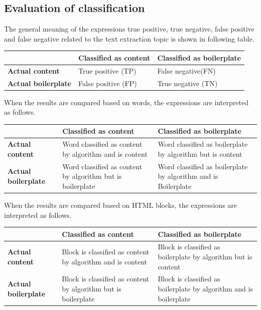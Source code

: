 \subsection{Evaluation of classification}
\label{subsec:Evaluation of classification}


The general meaning of the expressions true positive, true negative, false positive and false negative related to the text extraction topic is shown in following table.

\begin{table}[h]
\begin{tabular}{|p{4cm} |p{5.5cm} |p{5.5cm} |}\hline
          								& \textbf{Classified as content} 	& \textbf{Classified as boilerplate} 	\\ \hline
\textbf{Actual content} 				& True positive (TP)				& False negative(FN)					\\ \hline
\textbf{Actual boilerplate} 			& False positive (FP)       		& True negative (TN)				 	\\ \hline
\end{tabular}
\end{table}

When the results are compared based on words, the expressions are interpreted as follows.

 \begin{table}[h]
\begin{tabular}{|p{4cm} |p{5.5cm} |p{5.5cm} |}
\hline         								& \textbf{Classified as content} 				& \textbf{Classified as boilerplate} 					\\ \hline
\textbf{Actual content} 				& Word classified as content by algorithm and is content		& Word classified as boilerplate by algorithm but is content		\\ \hline
\textbf{Actual boilerplate} 			& Word classified as content by algorithm but is boilerplate 	& Word classified as boilerplate by algorithm and is Boilerplate	\\ \hline
\end{tabular}
\end{table}

When the results are compared based on HTML blocks, the expressions are interpreted as follows.

 \begin{table}[h]
\begin{tabular}{|p{4cm} |p{5.5cm} |p{5.5cm} |}
\hline         							& \textbf{Classified as content} 								& \textbf{Classified as boilerplate} 								\\ \hline
\textbf{Actual content} 				& Block is classified as content by algorithm and is content		& Block is classified as boilerplate by algorithm but is content		\\ \hline
\textbf{Actual boilerplate} 			& Block is classified as content by algorithm but is boilerplate 	& Block is classified as boilerplate by algorithm and is boilerplate	\\ \hline
\end{tabular}
\end{table}

